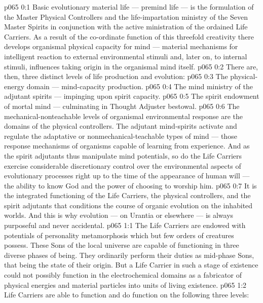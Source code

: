 \author{Life Carrier}
\vs p065 0:1 Basic evolutionary material life --- premind life --- is the formulation of the Master Physical Controllers and the life\hyp{}impartation ministry of the Seven Master Spirits in conjunction with the active ministration of the ordained Life Carriers. As a result of the co\hyp{}ordinate function of this threefold creativity there develops organismal physical capacity for mind --- material mechanisms for intelligent reaction to external environmental stimuli and, later on, to internal stimuli, influences taking origin in the organismal mind itself.
\vs p065 0:2 \pc There are, then, three distinct levels of life production and evolution:
\vs p065 0:3 \bibnobreakspace The physical\hyp{}energy domain --- mind\hyp{}capacity production.
\vs p065 0:4 \bibnobreakspace The mind ministry of the adjutant spirits --- impinging upon spirit capacity.
\vs p065 0:5 \bibnobreakspace The spirit endowment of mortal mind --- culminating in Thought Adjuster bestowal.
\vs p065 0:6 \pc The mechanical\hyp{}nonteachable levels of organismal environmental response are the domains of the physical controllers. The adjutant mind\hyp{}spirits activate and regulate the adaptative or nonmechanical\hyp{}teachable types of mind --- those response mechanisms of organisms capable of learning from experience. And as the spirit adjutants thus manipulate mind potentials, so do the Life Carriers exercise considerable discretionary control over the environmental aspects of evolutionary processes right up to the time of the appearance of human will --- the ability to know God and the power of choosing to worship him.
\vs p065 0:7 It is the integrated functioning of the Life Carriers, the physical controllers, and the spirit adjutants that conditions the course of organic evolution on the inhabited worlds. And this is why evolution --- on Urantia or elsewhere --- is always purposeful and never accidental.
\vs p065 1:1 The Life Carriers are endowed with potentials of personality metamorphosis which but few orders of creatures possess. These Sons of the local universe are capable of functioning in three diverse phases of being. They ordinarily perform their duties as mid\hyp{}phase Sons, that being the state of their origin. But a Life Carrier in such a stage of existence could not possibly function in the electrochemical domains as a fabricator of physical energies and material particles into units of living existence.
\vs p065 1:2 Life Carriers are able to function and do function on the following three levels:
